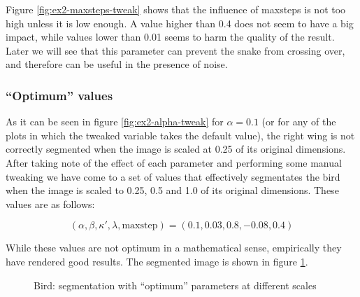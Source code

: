 Figure \ref{fig:ex2-maxsteps-tweak} shows that the influence of maxsteps is not too  high unless
it is low enough. A value higher than 0.4 does not seem to have a big impact, while values lower
than 0.01 seems to harm the quality of the result. Later we will see that this parameter can prevent the snake from crossing over, and therefore can be useful in the presence of noise.

\subsubsection{``Optimum'' values}

As it can be seen in figure \ref{fig:ex2-alpha-tweak} for
$ \alpha = 0.1 $ (or for any of the plots in which the tweaked variable takes the default value), the right wing is not correctly segmented when the image
is scaled at 0.25 of its original dimensions. After taking note of the effect of each parameter
and performing some manual tweaking we have come to a set of values that effectively segmentates the bird when the image is scaled to 0.25, 0.5 and 1.0 of its original dimensions. These values are as follows:

\[ (\alpha , \beta , \kappa' , \lambda , \mathrm{maxstep} ) = (0.1, 0.03, 0.8, -0.08, 0.4) \]

While these values are not optimum in a mathematical sense, empirically they have rendered good results. The segmented image is shown in figure \ref{fig:bird-segmentated}.

\begin{figure}[!hbt]
\centering
{}
\caption{Bird: segmentation with ``optimum'' parameters at different scales}
\label{fig:bird-segmentated}
\end{figure}

